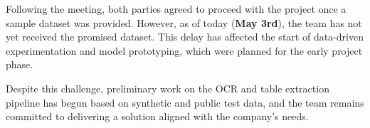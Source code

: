 \documentclass[12pt]{article}
\begin{document}
Following the meeting, both parties agreed to proceed with the project once a sample dataset was provided. However, as of today (\textbf{May 3rd}), the team has not yet received the promised dataset. This delay has affected the start of data-driven experimentation and model prototyping, which were planned for the early project phase.

Despite this challenge, preliminary work on the OCR and table extraction pipeline has begun based on synthetic and public test data, and the team remains committed to delivering a solution aligned with the company’s needs.
\end{document}
